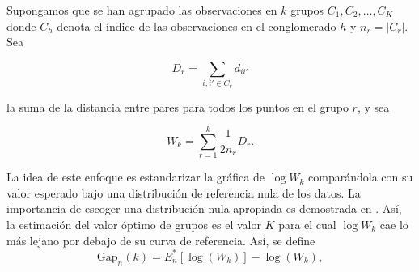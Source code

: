 Supongamos que se han agrupado las observaciones en $k$ grupos $C_{1},C_{2}, \dots, C_{K}$ donde $C_{h}$ denota el índice de las observaciones en el conglomerado $h$ y $n_{r}=|{C_{r}}|$. Sea

\begin{equation}
D_r = \sum_{i,i' \in C_{r}} d_{ii'}
\end{equation}

la suma de la distancia entre pares para todos los puntos en el grupo $r$, y sea

\begin{equation}
W_k = \sum_{r=1}^k \dfrac{1}{2n_{r}}D_{r}.
\end{equation}

La idea de este enfoque es estandarizar la gráfica de $\log{W_k}$ comparándola con su valor esperado bajo una distribución de referencia nula de los datos. La importancia de escoger una distribución nula apropiada es demostrada en \citet{gordon}. Así, la estimación del valor óptimo de grupos es el valor $K$ para el cual $\log{W_{k}}$ cae lo más lejano por debajo de su curva de referencia. Así, se define
\begin{equation}
\mbox{Gap}_{n}(k)=E^\ast_{n} \left[ \log(W_{k}) \right]  - \log(W_{k}), 
\end{equation}

